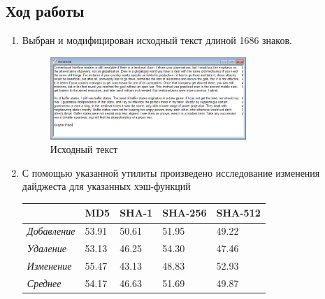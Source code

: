 \documentclass[a4paper, 14pt]{extarticle}
\begin{document}
\subsection{Ход работы}
\begin{enumerate}
    \item Выбран и модифицирован исходный текст длиной 1686 знаков.
        \begin{figure}[h]
            \centering
            \includegraphics[width=0.7\textwidth]{img/S004.jpg}
            \caption{Исходный текст}%
            \label{img:s1:1}
        \end{figure}

    \item С помощью указанной утилиты произведено исследование изменения дайджеста для указанных хэш-функций

        \begin{table}[h]
            \centering
            \begin{tabular}{@{}lllll@{}}
                \toprule
                    & \textbf{MD5} & \textbf{SHA-1} & \textbf{SHA-256} & \textbf{SHA-512} \\ \midrule
                \textit{Добавление} & 53.91        & 50.61          & 51.95            & 49.22            \\
                \textit{Удаление}   & 53.13        & 46.25          & 54.30            & 47.46            \\
                \textit{Изменение}  & 55.47        & 43.13          & 48.83            & 52.93            \\
                \textit{Среднее}    & 54.17        & 46.63          & 51.69            & 49.87            \\ \bottomrule
            \end{tabular}
        \end{table}
        

\end{enumerate}
\end{document}
